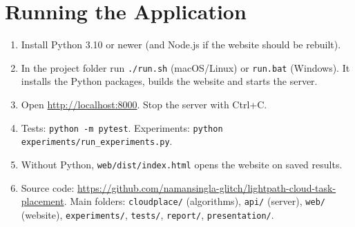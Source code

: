 \appendix
\section{Running the Application}
\begin{enumerate}[leftmargin=*]
\item Install Python 3.10 or newer (and Node.js if the website should be rebuilt).
\item In the project folder run \texttt{./run.sh} (macOS/Linux) or \texttt{run.bat} (Windows). It installs the Python packages, builds the website and starts the server.
\item Open \url{http://localhost:8000}. Stop the server with Ctrl+C.
\item Tests: \texttt{python -m pytest}. Experiments: \texttt{python experiments/run\_experiments.py}.
\item Without Python, \texttt{web/dist/index.html} opens the website on saved results.
\item Source code: \url{https://github.com/namansingla-glitch/lightpath-cloud-task-placement}. Main folders: \texttt{cloudplace/} (algorithms), \texttt{api/} (server), \texttt{web/} (website), \texttt{experiments/}, \texttt{tests/}, \texttt{report/}, \texttt{presentation/}.
\end{enumerate}

